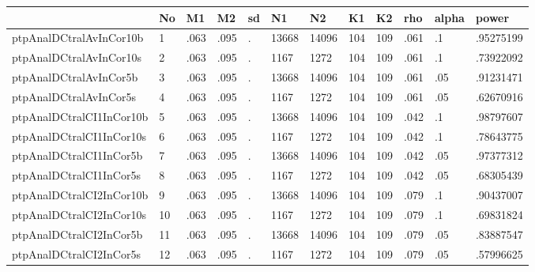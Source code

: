\begin{table}[htbp]
\begin{tabular}{|l|l|l|l|l|l|l|l|l|l|l|l|}\hline  
 & No  & M1  & M2  & sd  & N1  & N2  & K1  & K2  & rho  & alpha  & power  \\ \hline  
ptpAnalDCtralAvInCor10b & 1 & .063 & .095 & . & 13668 & 14096 & 104 & 109 & .061 & .1 & .95275199 \\ \hline 
ptpAnalDCtralAvInCor10s & 2 & .063 & .095 & . & 1167 & 1272 & 104 & 109 & .061 & .1 & .73922092 \\ \hline 
ptpAnalDCtralAvInCor5b & 3 & .063 & .095 & . & 13668 & 14096 & 104 & 109 & .061 & .05 & .91231471 \\ \hline 
ptpAnalDCtralAvInCor5s & 4 & .063 & .095 & . & 1167 & 1272 & 104 & 109 & .061 & .05 & .62670916 \\ \hline 
ptpAnalDCtralCI1InCor10b & 5 & .063 & .095 & . & 13668 & 14096 & 104 & 109 & .042 & .1 & .98797607 \\ \hline 
ptpAnalDCtralCI1InCor10s & 6 & .063 & .095 & . & 1167 & 1272 & 104 & 109 & .042 & .1 & .78643775 \\ \hline 
ptpAnalDCtralCI1InCor5b & 7 & .063 & .095 & . & 13668 & 14096 & 104 & 109 & .042 & .05 & .97377312 \\ \hline 
ptpAnalDCtralCI1InCor5s & 8 & .063 & .095 & . & 1167 & 1272 & 104 & 109 & .042 & .05 & .68305439 \\ \hline 
ptpAnalDCtralCI2InCor10b & 9 & .063 & .095 & . & 13668 & 14096 & 104 & 109 & .079 & .1 & .90437007 \\ \hline 
ptpAnalDCtralCI2InCor10s & 10 & .063 & .095 & . & 1167 & 1272 & 104 & 109 & .079 & .1 & .69831824 \\ \hline 
ptpAnalDCtralCI2InCor5b & 11 & .063 & .095 & . & 13668 & 14096 & 104 & 109 & .079 & .05 & .83887547 \\ \hline 
ptpAnalDCtralCI2InCor5s & 12 & .063 & .095 & . & 1167 & 1272 & 104 & 109 & .079 & .05 & .57996625 \\ \hline 
  \end{tabular}
\end{table}
